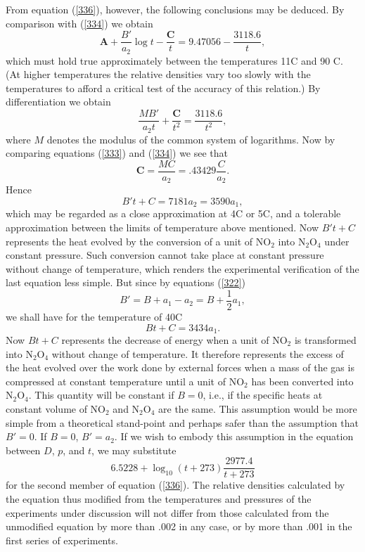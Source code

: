\documentclass[12pt]{article}
\begin{document}
From equation (\ref{336}), however, the following conclusions may be
deduced. By comparison with (\ref{334}) we obtain
$$ \mathbf{A} +\frac{B'}{a_2} \log t  -\frac{\mathbf{C}}{t}=  9.47056- \frac{3118.6}{t}, $$
which must hold true approximately between the temperatures 11\degree C and 90 \degree C. (At higher temperatures the relative densities vary too slowly with the temperatures to afford a critical test of the accuracy of this relation.) By differentiation we obtain
$$\frac{MB'}{a_2 t} +\frac{\mathbf{C}}{t^2} = \frac{3118.6}{t^2}, $$
where $M$ denotes the modulus of the common system of logarithms. Now by comparing equations (\ref{333}) and (\ref{334}) we see that
$$\mathbf{C} = \frac{MC}{a_2} = .43429 \frac{C}{a_2}.$$
Hence        
$$  B't + C= 7181 a_2= 3590a_1,$$
which may be regarded as a close approximation at 4\degree C or 5\degree C, and a tolerable approximation between the limits of temperature above mentioned.  Now $B't+C$ represents the heat evolved by the conversion of a unit of NO$_2$ into N$_2$O$_4$ under constant pressure. Such conversion cannot take place at constant pressure without change of temperature, which renders the experimental verification of the last equation less simple. But since by equations (\ref{322})
$$B' =B+a_1-a_2=B+ \frac{1}{2}a_1,$$
we shall have for the temperature of 40\degree C
$$Bt + C= 3434a_1.$$
Now $Bt+ C$ represents the decrease of energy when a unit of NO$_2$ is transformed into N$_2$O$_4$ without change of temperature. It therefore represents the excess of the heat evolved over the work done by external forces when a mass of the gas is compressed at constant temperature until a unit of NO$_2$ has been converted into N$_2$O$_4$. This quantity will be constant if $B=0$, i.e., if the specific heats at constant volume of NO$_2$ and N$_2$O$_4$ are the same. This assumption would be more simple from a theoretical stand-point and perhaps safer than the assumption that $B'=0$. If $B=0$, $B'=a_2$. If we wish to embody this assumption in the equation between $D$, $p$, and $t$, we may substitute
$$6.5228 + \log_{10}(t + 273) \frac{ 2977.4}{t + 273}$$
for the second member of equation (\ref{336}).  The relative densities calculated by the equation thus modified from the temperatures and pressures of the experiments under discussion will not differ from those calculated from the unmodified equation by more than .002 in any case, or by more than .001 in the first series of experiments.
\end{document}
